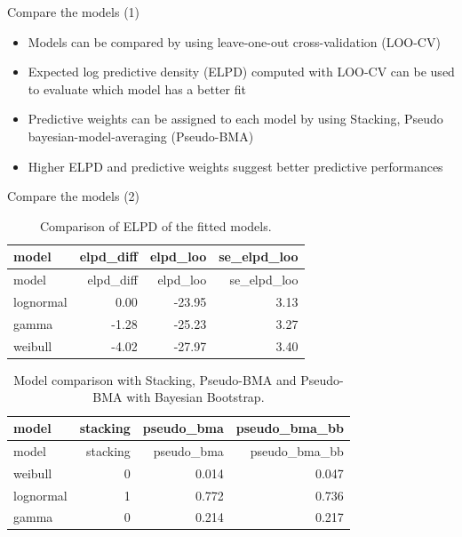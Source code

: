 \documentclass[ignorenonframetext,a4paper]{beamer}
\begin{document}
\begin{frame}{Compare the models (1)}

\begin{itemize}
\setlength\itemsep{1em}
  \item{Models can be compared by using leave-one-out cross-validation
        (LOO-CV)}
  \item{Expected log predictive density (ELPD) computed with LOO-CV
        can be used to evaluate which model has a better fit}
  \item{Predictive weights can be assigned to each model by using
        Stacking, Pseudo bayesian-model-averaging (Pseudo-BMA)}
  \item{Higher ELPD and predictive weights suggest better 
        predictive performances}
\end{itemize}

\end{frame}

\begin{frame}{Compare the models (2)}

\scriptsize

\begin{longtable}[]{@{}lrrr@{}}
\caption{Comparison of ELPD of the fitted models.}\tabularnewline
\toprule
model & elpd\_diff & elpd\_loo & se\_elpd\_loo\tabularnewline
\midrule
\endfirsthead
\toprule
model & elpd\_diff & elpd\_loo & se\_elpd\_loo\tabularnewline
\midrule
\endhead
lognormal & 0.00 & -23.95 & 3.13\tabularnewline
gamma & -1.28 & -25.23 & 3.27\tabularnewline
weibull & -4.02 & -27.97 & 3.40\tabularnewline
\bottomrule
\end{longtable}

\begin{longtable}[]{@{}lrrr@{}}
\caption{Model comparison with Stacking, Pseudo-BMA and Pseudo-BMA with
Bayesian Bootstrap.}\tabularnewline
\toprule
model & stacking & pseudo\_bma & pseudo\_bma\_bb\tabularnewline
\midrule
\endfirsthead
\toprule
model & stacking & pseudo\_bma & pseudo\_bma\_bb\tabularnewline
\midrule
\endhead
weibull & 0 & 0.014 & 0.047\tabularnewline
lognormal & 1 & 0.772 & 0.736\tabularnewline
gamma & 0 & 0.214 & 0.217\tabularnewline
\bottomrule
\end{longtable}

\end{frame}
\end{document}
